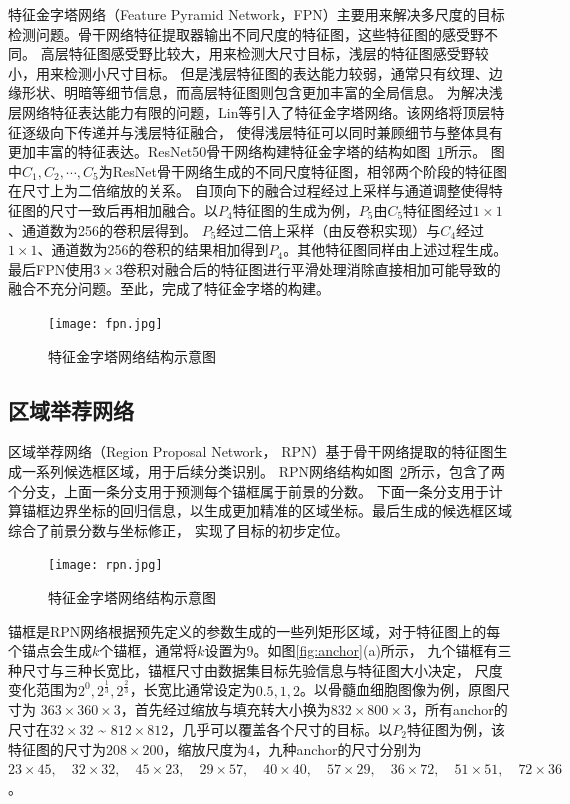 特征金字塔网络（Feature Pyramid Network，FPN）主要用来解决多尺度的目标检测问题。骨干网络特征提取器输出不同尺度的特征图，这些特征图的感受野不同。
高层特征图感受野比较大，用来检测大尺寸目标，浅层的特征图感受野较小，用来检测小尺寸目标。
但是浅层特征图的表达能力较弱，通常只有纹理、边缘形状、明暗等细节信息，而高层特征图则包含更加丰富的全局信息。
为解决浅层网络特征表达能力有限的问题，Lin等\cite{2017Feature}引入了特征金字塔网络。该网络将顶层特征逐级向下传递并与浅层特征融合，
使得浅层特征可以同时兼顾细节与整体具有更加丰富的特征表达。ResNet50骨干网络构建特征金字塔的结构如图~\ref{fig:fpn}所示。
图中$C_1,C_2,\cdots, C_5$为ResNet骨干网络生成的不同尺度特征图，相邻两个阶段的特征图在尺寸上为二倍缩放的关系。
自顶向下的融合过程经过上采样与通道调整使得特征图的尺寸一致后再相加融合。以$P_4$特征图的生成为例，$P_5$由$C_5$特征图经过$1\times1$、通道数为256的卷积层得到。
$P_5$经过二倍上采样（由反卷积实现）与$C_4$经过$1\times1$、通道数为256的卷积的结果相加得到$P_4$。其他特征图同样由上述过程生成。
最后FPN使用$3 \times 3$卷积对融合后的特征图进行平滑处理消除直接相加可能导致的融合不充分问题。至此，完成了特征金字塔的构建。

\begin{figure}[htbp]            
  \centering             
  \texttt{[image: fpn.jpg]}             
  \caption{特征金字塔网络结构示意图}             
  \label{fig:fpn}    
\end{figure}    

\subsection{区域举荐网络}

区域举荐网络（Region Proposal Network， RPN）基于骨干网络提取的特征图生成一系列候选框区域，用于后续分类识别。
RPN网络结构如图~\ref{fig:rpn}所示，包含了两个分支，上面一条分支用于预测每个锚框属于前景的分数。
下面一条分支用于计算锚框边界坐标的回归信息，以生成更加精准的区域坐标。最后生成的候选框区域综合了前景分数与坐标修正，
实现了目标的初步定位。

\begin{figure}[htbp]              
  \centering                
  \texttt{[image: rpn.jpg]}                
  \caption{特征金字塔网络结构示意图}                
  \label{fig:rpn}     
\end{figure}   

锚框是RPN网络根据预先定义的参数生成的一些列矩形区域，对于特征图上的每个锚点会生成$k$个锚框，通常将$k$设置为$9$。如图\ref{fig:anchor}(a)所示，
九个锚框有三种尺寸与三种长宽比，锚框尺寸由数据集目标先验信息与特征图大小决定，
尺度变化范围为$2^0, 2^{\frac{1}{3}},  2^{\frac{2}{3}}$，长宽比通常设定为$0.5, 1, 2$。以骨髓血细胞图像为例，原图尺寸为
$363 \times 360 \times 3$，首先经过缩放与填充转大小换为$832 \times 800 \times 3$，所有anchor的尺寸在$32 \times 32$ \textasciitilde
$812 \times 812$，几乎可以覆盖各个尺寸的目标。以$P_2$特征图为例，该特征图的尺寸为$208 \times 200$，缩放尺度为4，九种anchor的尺寸分别为
$23 \times 45,\quad32 \times 32,\quad45 \times 23,\quad29 \times 57,\quad40 \times 40,\quad57 \times 29,\quad36 \times 72,\quad51 \times 51,\quad72 \times 36$。

